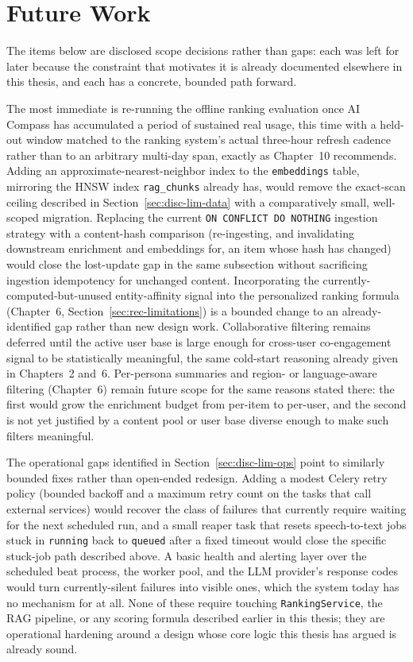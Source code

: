 \section{Future Work}
\label{sec:disc-future}

The items below are disclosed scope decisions rather than gaps: each was left for later because the constraint that motivates it is already documented elsewhere in this thesis, and each has a concrete, bounded path forward.

The most immediate is re-running the offline ranking evaluation once AI Compass has accumulated a period of sustained real usage, this time with a held-out window matched to the ranking system's actual three-hour refresh cadence rather than to an arbitrary multi-day span, exactly as Chapter~10 recommends. Adding an approximate-nearest-neighbor index to the \texttt{embeddings} table, mirroring the HNSW index \texttt{rag\_chunks} already has, would remove the exact-scan ceiling described in Section~\ref{sec:disc-lim-data} with a comparatively small, well-scoped migration. Replacing the current \texttt{ON CONFLICT DO NOTHING} ingestion strategy with a content-hash comparison (re-ingesting, and invalidating downstream enrichment and embeddings for, an item whose hash has changed) would close the lost-update gap in the same subsection without sacrificing ingestion idempotency for unchanged content. Incorporating the currently-computed-but-unused entity-affinity signal into the personalized ranking formula (Chapter~6, Section~\ref{sec:rec-limitations}) is a bounded change to an already-identified gap rather than new design work. Collaborative filtering remains deferred until the active user base is large enough for cross-user co-engagement signal to be statistically meaningful, the same cold-start reasoning already given in Chapters~2 and~6. Per-persona summaries and region- or language-aware filtering (Chapter~6) remain future scope for the same reasons stated there: the first would grow the enrichment budget from per-item to per-user, and the second is not yet justified by a content pool or user base diverse enough to make such filters meaningful.

The operational gaps identified in Section~\ref{sec:disc-lim-ops} point to similarly bounded fixes rather than open-ended redesign. Adding a modest Celery retry policy (bounded backoff and a maximum retry count on the tasks that call external services) would recover the class of failures that currently require waiting for the next scheduled run, and a small reaper task that resets speech-to-text jobs stuck in \texttt{running} back to \texttt{queued} after a fixed timeout would close the specific stuck-job path described above. A basic health and alerting layer over the scheduled beat process, the worker pool, and the LLM provider's response codes would turn currently-silent failures into visible ones, which the system today has no mechanism for at all. None of these require touching \texttt{RankingService}, the RAG pipeline, or any scoring formula described earlier in this thesis; they are operational hardening around a design whose core logic this thesis has argued is already sound.
